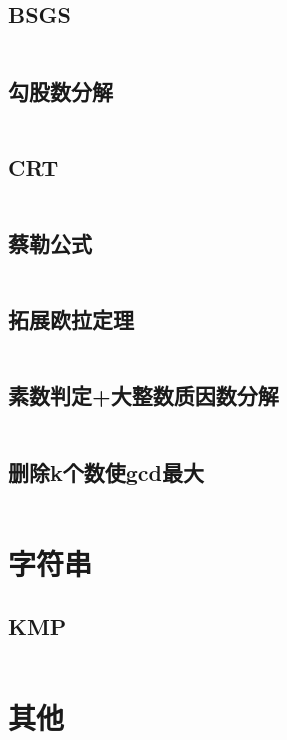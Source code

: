 \documentclass{article}
\begin{document}
\subsection{BSGS}
\inputminted[breaklines]{c++}{../数学/BSGS.cpp}

\subsection{勾股数分解}
\inputminted[breaklines]{c++}{../数学/勾股数.cpp}

\subsection{CRT}
\inputminted[breaklines]{c++}{../数学/CRT.cpp}

\subsection{蔡勒公式}
\inputminted[breaklines]{c++}{../数学/蔡勒公式.cpp}

\subsection{拓展欧拉定理}
\inputminted[breaklines]{c++}{../数学/拓展欧拉定理.cpp}

\subsection{素数判定+大整数质因数分解}
\inputminted[breaklines]{c++}{../数学/素数判定+大整数质因数分解.cpp}

\subsection{删除k个数使gcd最大}
\inputminted[breaklines]{c++}{../数学/删除k个数使gcd最大.cpp}

\newpage
\section{字符串}
\subsection{KMP}
\inputminted[breaklines]{c++}{../字符串/KMP.cpp}

\newpage
\section{其他}
\end{document}
